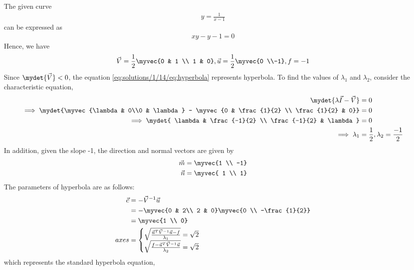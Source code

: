 The given curve 
\begin{align}
	y =\frac{1}{x-1}
\end{align}
can be expressed as 
\begin{align}
	xy - y - 1 = 0 \label{eq:solutions/1/14/eq:hyperbola}
\end{align}
Hence, we have
\begin{align}
	\vec{V} = \frac{1}{2}\myvec{0 & 1 \\ 1 & 0}, 
	\vec{u} = \frac{1}{2}\myvec{0 \\-1},
	f = -1
\end{align}
Since $\mydet{\vec{V}} < 0$, the equation \eqref{eq:solutions/1/14/eq:hyperbola} represents hyperbola.
To find the values of $\lambda_1$ and $\lambda_2$, consider the characteristic equation,
\begin{align}
	\mydet{\lambda\vec{I} - \vec{V}} &= 0\\
	\implies \mydet{\myvec{\lambda & 0\\0 & \lambda} - \myvec{0 & \frac{1}{2} \\ \frac{1}{2} & 0}} &= 0\\
	\implies \mydet{ \lambda & \frac{-1}{2} \\ \frac{-1}{2} & \lambda} &= 0\\
	\implies \lambda_1 &= \frac{1}{2} , \lambda_2 = \frac{-1}{2}
\end{align}
In addition, given the slope -1, the direction and normal vectors are given by 
\begin{align}
	\vec{m} = \myvec{1 \\ -1} \\
	\vec{n} = \myvec{ 1 \\ 1}
\end{align}
The parameters of hyperbola are as follows:
\begin{align}
	\vec{c} &= -\vec{V}^{-1}\vec{u} \\
	&= -\myvec{0 & 2\\ 2 & 0}\myvec{0 \\ -\frac{1}{2}} \\
	&= \myvec{1 \\ 0}\\
	axes &= \begin{cases}
	\sqrt{\frac{\vec{u}^T\vec{V}^{-1}\vec{u} - f}{\lambda_1}} = \sqrt{2}\\
 \sqrt{\frac{f-\vec{u}^T\vec{V}^{-1}\vec{u}}{\lambda_2}} = \sqrt{2}
\end{cases}
\end{align}
which represents the standard hyperbola equation,
